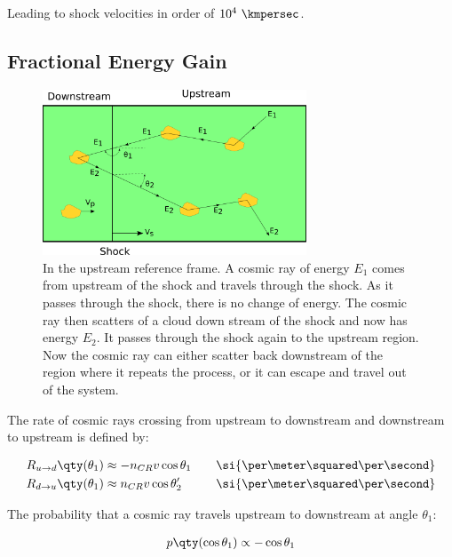 Leading to shock velocities in order of $10^4~\kmpersec$.

\subsection{Fractional Energy Gain}

\begin{figure} [h]
	\centering
	\includegraphics[width=0.7\textwidth]{A1_Supernova_Remnants/Images/fermi_second_theory_clouds.png}
	\caption{In the upstream reference frame. A cosmic ray of energy $E_1$ comes from upstream of the shock and travels through the shock. As it passes through the shock, there is no change of energy. The cosmic ray then scatters of a cloud down stream of the shock and now has energy $E_2$. It passes through the shock again to the upstream region. Now the cosmic ray can either scatter back downstream of the region where it repeats the process, or it can escape and travel out of the system.}
	\label{fig:appendix_A_fermi_2nd_clouds}
\end{figure}

The rate of cosmic rays crossing from upstream to downstream and downstream to upstream is defined by:

\begin{equation}
    \begin{aligned}
    R_{u\rightarrow d}\qty(\theta_1)&\approx-n_{CR}v\cos\theta_1\quad &\si{\per\meter\squared\per\second} \\
R_{d\rightarrow u}\qty(\theta_1)&\approx n_{CR}v\cos\theta_2'\quad&\si{\per\meter\squared\per\second} 
    \end{aligned}
\end{equation}

The probability that a cosmic ray travels upstream to downstream at angle $\theta_1$:

\begin{equation}
    \begin{aligned}
    p\qty(\cos\theta_1)\propto-\cos\theta_1
    \end{aligned}
\end{equation}


